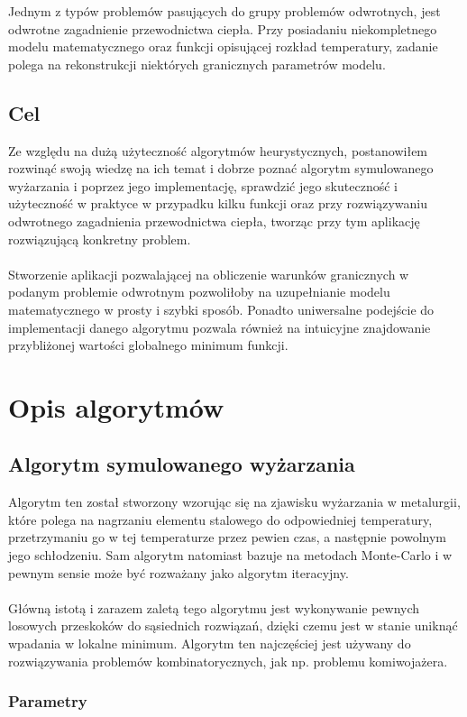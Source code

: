 \documentclass[twoside]{projektInzynierskiMS1}
\newcommand{\newLine}{~\\}
\newcommand{\si}{ś}
\begin{document}
Jednym z typów problemów pasujących do grupy problemów odwrotnych, jest odwrotne zagadnienie przewodnictwa ciepła. Przy posiadaniu niekompletnego modelu matematycznego oraz funkcji opisującej rozkład temperatury, zadanie polega na rekonstrukcji niektórych granicznych parametrów modelu. 

\subsection{Cel}

Ze względu na dużą użyteczno\si ć algorytmów heurystycznych, postanowiłem rozwinąć swoją wiedzę na ich temat i dobrze poznać algorytm symulowanego wyżarzania i poprzez jego implementację, sprawdzić jego skuteczno\si ć i użyteczno\si ć w praktyce w przypadku kilku funkcji oraz przy rozwiązywaniu odwrotnego zagadnienia przewodnictwa ciepła, tworząc przy tym aplikację rozwiązującą konkretny problem. \\ \newLine
Stworzenie aplikacji pozwalającej na obliczenie warunków granicznych w podanym problemie odwrotnym pozwoliłoby na uzupełnianie modelu matematycznego w prosty i szybki sposób. Ponadto uniwersalne podej\si cie do implementacji danego algorytmu pozwala również na intuicyjne znajdowanie przybliżonej warto\si ci globalnego minimum funkcji.



\section{Opis algorytmów}
	\subsection{Algorytm symulowanego wyżarzania}
				Algorytm ten został stworzony wzorując się na zjawisku wyżarzania w metalurgii, które polega na nagrzaniu elementu stalowego do odpowiedniej temperatury, przetrzymaniu go w tej temperaturze przez pewien czas, a następnie powolnym jego schłodzeniu. Sam algorytm natomiast bazuje na metodach Monte-Carlo i w pewnym sensie może być rozważany jako algorytm iteracyjny.\\ \newLine
Główną istotą i zarazem zaletą tego algorytmu jest wykonywanie pewnych losowych przeskoków do sąsiednich rozwiązań, dzięki czemu jest w stanie uniknąć wpadania w lokalne minimum. Algorytm ten najczę\si ciej jest używany do rozwiązywania problemów kombinatorycznych, jak np. problemu komiwojażera.
		\subsubsection{Parametry}
		
\end{document}
